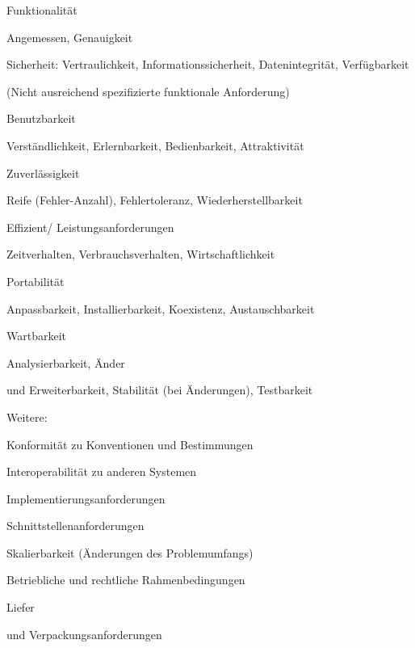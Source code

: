 \documentclass[a4paper]{article}
\begin{document}
\begin{multicols}{3}
  \begin{itemize*}
    \item Funktionalität
          \begin{itemize*}
            \item Angemessen, Genauigkeit
            \item Sicherheit: Vertraulichkeit, Informationssicherheit, Datenintegrität, Verfügbarkeit
            \item (Nicht ausreichend spezifizierte funktionale Anforderung)
          \end{itemize*}
    \item Benutzbarkeit
          \begin{itemize*}
            \item Verständlichkeit, Erlernbarkeit, Bedienbarkeit, Attraktivität
          \end{itemize*}
    \item Zuverlässigkeit
          \begin{itemize*}
            \item Reife (Fehler-Anzahl), Fehlertoleranz, Wiederherstellbarkeit
          \end{itemize*}
    \item Effizient/ Leistungsanforderungen
          \begin{itemize*}
            \item Zeitverhalten, Verbrauchsverhalten, Wirtschaftlichkeit
          \end{itemize*}
    \item Portabilität
          \begin{itemize*}
            \item Anpassbarkeit, Installierbarkeit, Koexistenz, Austauschbarkeit
          \end{itemize*}
    \item Wartbarkeit
          \begin{itemize*}
            \item Analysierbarkeit, Änder\item und Erweiterbarkeit, Stabilität (bei Änderungen), Testbarkeit
          \end{itemize*}
    \item Weitere:
          \begin{itemize*}
            \item Konformität zu Konventionen und Bestimmungen
            \item Interoperabilität zu anderen Systemen
            \item Implementierungsanforderungen
            \item Schnittstellenanforderungen
            \item Skalierbarkeit (Änderungen des Problemumfangs)
            \item Betriebliche und rechtliche Rahmenbedingungen
            \item Liefer\item und Verpackungsanforderungen
          \end{itemize*}
  \end{itemize*}


\end{multicols}
\end{document}
